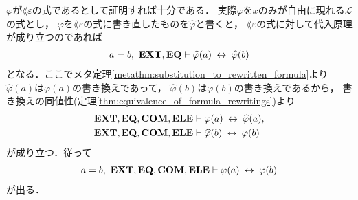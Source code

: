 	$\varphi$が$\lang{\varepsilon}$の式であるとして証明すれば十分である．
	実際$\varphi$を$x$のみが自由に現れる$\mathcal{L}$の式とし，
	$\varphi$を$\lang{\varepsilon}$の式に書き直したものを$\widehat{\varphi}$と書くと，
	$\lang{\varepsilon}$の式に対して代入原理が成り立つのであれば
	\begin{align}
		a = b,\ \mbox{{\bf EXT}},\mbox{{\bf EQ}} \vdash \widehat{\varphi}(a) \hspace{0.25em}\leftrightarrow\hspace{0.25em} \widehat{\varphi}(b)
	\end{align}
	となる．ここでメタ定理\ref{metathm:substitution_to_rewritten_formula}より
	$\widehat{\varphi}(a)$は$\varphi(a)$の書き換えであって，
	$\widehat{\varphi}(b)$は$\varphi(b)$の書き換えであるから，
	書き換えの同値性(定理\ref{thm:equivalence_of_formula_rewritings})より
	\begin{align}
		\mbox{{\bf EXT}},\mbox{{\bf EQ}},\mbox{\bf COM},\mbox{{\bf ELE}} &\vdash \varphi(a) \hspace{0.25em}\leftrightarrow\hspace{0.25em} \widehat{\varphi}(a), \\
		\mbox{{\bf EXT}},\mbox{{\bf EQ}},\mbox{\bf COM},\mbox{{\bf ELE}} &\vdash \widehat{\varphi}(b) \hspace{0.25em}\leftrightarrow\hspace{0.25em} \varphi(b)
	\end{align}
	が成り立つ．従って
	\begin{align}
		a = b,\ \mbox{{\bf EXT}},\mbox{{\bf EQ}},\mbox{\bf COM},\mbox{{\bf ELE}} \vdash \varphi(a) \hspace{0.25em}\leftrightarrow\hspace{0.25em} \varphi(b)
	\end{align}
	が出る．
	
